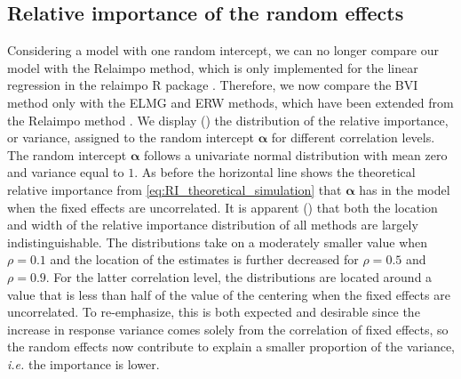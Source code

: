 \subsection{Relative importance of the random effects}
\label{sec:relimp_random}
Considering a model with one random intercept, we can no longer compare our model with the Relaimpo method, which is only implemented for the linear regression in the relaimpo R package \citep{gromping_relaimpo}. Therefore, we now compare the BVI method only with the ELMG and ERW methods, which have been extended from the Relaimpo method \citep{matre}.
We display () the distribution of the relative importance, or variance, assigned to the random intercept $\boldsymbol{\alpha}$ for different correlation levels. 
The random intercept $\boldsymbol{\alpha}$ follows a univariate normal distribution with mean zero and variance equal to $1$.
As before the horizontal line shows the theoretical relative importance from \eqref{eq:RI_theoretical_simulation} that $\boldsymbol{\alpha}$ has in the model when the fixed effects are uncorrelated.
\newline
\newline
It is apparent () that both the location and width of the relative importance distribution of all methods are largely indistinguishable. 
The distributions take on a moderately smaller value when $\rho=0.1$ and the location of the estimates is further decreased for $\rho=0.5$ and $\rho=0.9$. 
For the latter correlation level, the distributions are located around a value that is less than half of the value of the centering when the fixed effects are uncorrelated. 
To re-emphasize, this is both expected and desirable since the increase in response variance comes solely from the correlation of fixed effects, so the random effects now contribute to explain a smaller proportion of the variance, \textit{i.e.} the importance is lower.

